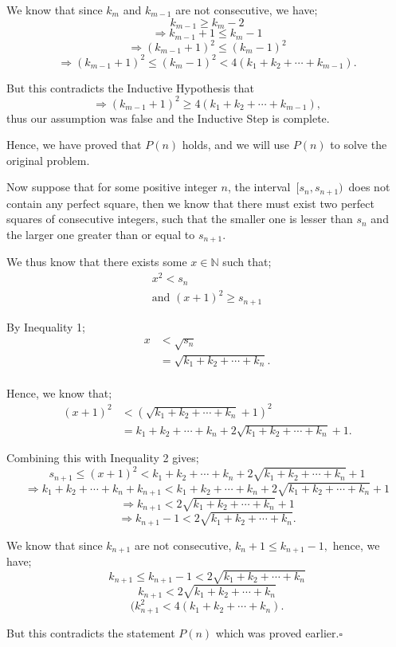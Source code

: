 \begin{enumerate}
 We know that since $k_m$ and $k_{m-1}$ are not consecutive, we have;
 \[k_{m-1}\geq k_m-2\]
 \[\Rightarrow k_{m-1}+1\leq k_m-1\]
 \[\Rightarrow (k_{m-1}+1)^2\leq (k_m-1)^2\]
 \[\Rightarrow (k_{m-1}+1)^2\leq (k_m-1)^2<4(k_1+k_2+\cdots +k_{m-1}).\]

 But this contradicts the Inductive Hypothesis that 
 \[\Rightarrow (k_{m-1}+1)^2\geq 4(k_1+k_2+\cdots +k_{m-1}),\] thus our assumption was false and the Inductive Step is complete.

 Hence, we have proved that $P(n)$ holds, and we will use $P(n)$ to solve the original problem.

 
Now suppose that for some positive integer $n$, the interval $\, [s_n, s_{n+1})\,$ does not contain any perfect square, then we know that there must exist two perfect squares of consecutive integers, such that the smaller one is lesser than $s_n$ and the larger one greater than or equal to $s_{n+1}.$

 We thus know that there exists some $x\in\mathbb{N}$ such that;
 \begin{eqnarray} x^2<s_n \\ \text{and }(x+1)^2\geq s_{n+1} \end{eqnarray}

 By Inequality 1;
 \begin{align*} x &<\sqrt{s_n}\\ &=\sqrt{k_1+k_2+\cdots+k_n}.\\ \end{align*}


 
Hence, we know that;
 \begin{align*} (x+1)^2 &<(\sqrt{k_1+k_2+\cdots+k_n}+1)^2\\ &=k_1+k_2+\cdots+k_n+2\sqrt{k_1+k_2+\cdots+k_n}+1. \end{align*}


 Combining this with Inequality 2 gives;
 \[s_{n+1}\leq (x+1)^2<k_1+k_2+\cdots+k_n+2\sqrt{k_1+k_2+\cdots+k_n}+1\]
 \[\Rightarrow k_1+k_2+\cdots+k_n+k_{n+1}<k_1+k_2+\cdots+k_n+2\sqrt{k_1+k_2+\cdots+k_n}+1\]
 \[\Rightarrow k_{n+1}<2\sqrt{k_1+k_2+\cdots+k_n}+1\]
 \[\Rightarrow k_{n+1}-1<2\sqrt{k_1+k_2+\cdots+k_n}.\]

 
We know that since $k_{n+1}$ are not consecutive, $k_n+1\leq k_{n+1}-1,$ hence, we have;
 \[k_{n+1}\leq k_{n+1}-1<2\sqrt{k_1+k_2+\cdots+k_n}\]
 \[k_{n+1}<2\sqrt{k_1+k_2+\cdots+k_n}\]
 \[(k_{n+1}^2<4(k_1+k_2+\cdots+k_n).\]

 
But this contradicts the statement $P(n)$ which was proved earlier.$\square$




\end{enumerate}
